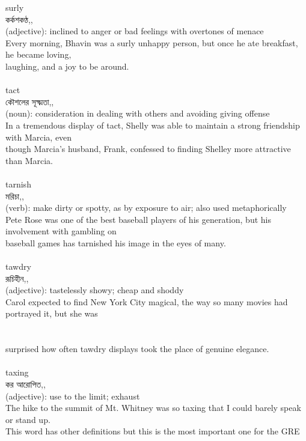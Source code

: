 \documentclass{article}
\begin{document}
{surly}\\
{কর্কশকণ্ঠ,,}\\
{(adjective): inclined to anger or bad feelings with overtones of menace\\Every morning, Bhavin was a surly unhappy person, but once he ate breakfast, he became loving,\\laughing, and a joy to be around.\\}\\
{tact}\\
{কৌশলের সূক্ষ্মতা,,}\\
{(noun): consideration in dealing with others and avoiding giving offense\\In a tremendous display of tact, Shelly was able to maintain a strong friendship with Marcia, even\\though Marcia's husband, Frank, confessed to finding Shelley more attractive than Marcia.\\}\\
{tarnish}\\
{মরিচা,,}\\
{(verb): make dirty or spotty, as by exposure to air; also used metaphorically\\Pete Rose was one of the best baseball players of his generation, but his involvement with gambling on\\baseball games has tarnished his image in the eyes of many.\\}\\
{tawdry}\\
{রূচিহীন,,}\\
{(adjective): tastelessly showy; cheap and shoddy\\Carol expected to find New York City magical, the way so many movies had portrayed it, but she was\\\\                                                                               \\surprised how often tawdry displays took the place of genuine elegance.\\}\\
{taxing}\\
{কর আরোপিত,,}\\
{(adjective): use to the limit; exhaust\\The hike to the summit of Mt. Whitney was so taxing that I could barely speak or stand up.\\This word has other definitions but this is the most important one for the GRE\\}\\
\end{document}
